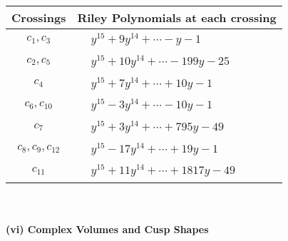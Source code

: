 \documentclass[1p]{elsarticle_modified}
\theoremstyle{definition}
\begin{document}
\begin{tabular}{m{50pt}|m{274pt}}
Crossings & \hspace{64pt}Riley Polynomials at each crossing \\
\hline $$\begin{aligned}c_{1},c_{3}\end{aligned}$$&$\begin{aligned}
&y^{15}+9 y^{14}+\cdots- y-1
\end{aligned}$\\
\hline $$\begin{aligned}c_{2},c_{5}\end{aligned}$$&$\begin{aligned}
&y^{15}+10 y^{14}+\cdots-199 y-25
\end{aligned}$\\
\hline $$\begin{aligned}c_{4}\end{aligned}$$&$\begin{aligned}
&y^{15}+7 y^{14}+\cdots+10 y-1
\end{aligned}$\\
\hline $$\begin{aligned}c_{6},c_{10}\end{aligned}$$&$\begin{aligned}
&y^{15}-3 y^{14}+\cdots-10 y-1
\end{aligned}$\\
\hline $$\begin{aligned}c_{7}\end{aligned}$$&$\begin{aligned}
&y^{15}+3 y^{14}+\cdots+795 y-49
\end{aligned}$\\
\hline $$\begin{aligned}c_{8},c_{9},c_{12}\end{aligned}$$&$\begin{aligned}
&y^{15}-17 y^{14}+\cdots+19 y-1
\end{aligned}$\\
\hline $$\begin{aligned}c_{11}\end{aligned}$$&$\begin{aligned}
&y^{15}+11 y^{14}+\cdots+1817 y-49
\end{aligned}$\\
\hline
\end{tabular}\\~\\
\newpage\flushleft \textbf{(vi) Complex Volumes and Cusp Shapes}
\end{document}
